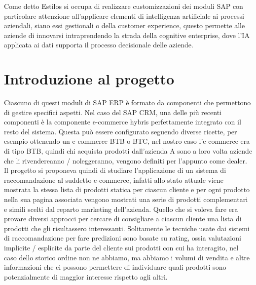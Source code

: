 Come detto Estilos si occupa di realizzare customizzazioni dei moduli SAP con particolare attenzione all'applicare elementi di intelligenza artificiale ai processi aziendali, siano essi gestionali o della customer experience, questo permette alle aziende di innovarsi intraprendendo la strada della cognitive enterprise, dove l'IA applicata ai dati supporta il processo decisionale delle aziende.

\section{Introduzione al progetto}
Ciascuno di questi moduli di SAP ERP è formato da componenti che permettono di gestire specifici aspetti. Nel caso del SAP CRM, una delle più recenti componenti è la componente e-commerce hybris perfettamente integrato con il resto del sistema. Questa può essere configurato seguendo diverse ricette, per esempio ottenendo un e-commerce BTB o BTC, nel nostro caso l'e-commerce era di tipo BTB, quindi chi acquista prodotti dall'azienda A sono a loro volta aziende che li rivendereanno / noleggeranno, vengono definiti per l'appunto come dealer. Il progetto si proponeva quindi di studiare l'applicazione di un sistema di raccomandazione al suddetto e-commerce, infatti allo stato attuale viene mostrata la stessa lista di prodotti statica per ciascun cliente e per ogni prodotto nella sua pagina associata vengono mostrati una serie di prodotti complementari e simili scelti dal reparto marketing dell'azienda. Quello che si voleva fare era provare diversi approcci per cercare di consigliare a ciascun cliente una lista di prodotti che gli risultassero interessanti. Solitamente le tecniche usate dai sistemi di raccomandazione per fare predizioni sono basate su rating, ossia valutazioni implicite / esplicite da parte del cliente sui prodotti con cui ha interagito, nel caso dello storico ordine non ne abbiamo, ma abbiamo i volumi di vendita e altre informazioni che ci possono permettere di individuare quali prodotti sono potenzialmente di maggior interesse rispetto agli altri.

